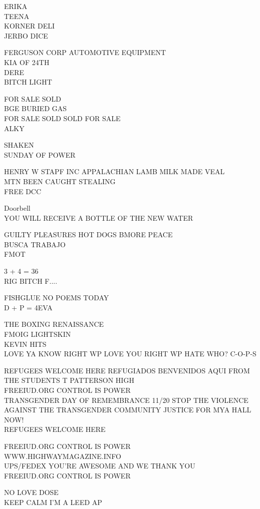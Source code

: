 \documentclass[10pt,letterpaper]{article}
\begin{document}
ERIKA\\
TEENA\\
KORNER DELI\\
JERBO DICE

FERGUSON CORP AUTOMOTIVE EQUIPMENT\\
KIA OF 24TH\\
DERE\\
BITCH LIGHT

FOR SALE SOLD\\
BGE BURIED GAS\\
FOR SALE SOLD SOLD FOR SALE\\
ALKY

SHAKEN\\
SUNDAY OF POWER

HENRY W STAPF INC APPALACHIAN LAMB MILK MADE VEAL\\
MTN BEEN CAUGHT STEALING\\
FREE DCC

Doorbell\\
YOU WILL RECEIVE A BOTTLE OF THE NEW WATER

GUILTY PLEASURES HOT DOGS BMORE PEACE\\
BUSCA TRABAJO\\
FMOT

3 + 4 = 36\\
RIG BITCH F....

FISHGLUE NO POEMS TODAY\\
D + P = 4EVA

THE BOXING RENAISSANCE\\
FMOIG LIGHTSKIN\\
KEVIN HITS\\
LOVE YA KNOW RIGHT WP LOVE YOU RIGHT WP HATE WHO? C{-}O{-}P{-}S

REFUGEES WELCOME HERE REFUGIADOS BENVENIDOS AQUI FROM THE STUDENTS T PATTERSON HIGH\\
FREEIUD.ORG CONTROL IS POWER\\
TRANSGENDER DAY OF REMEMBRANCE 11/20 STOP THE VIOLENCE AGAINST THE TRANSGENDER COMMUNITY JUSTICE FOR MYA HALL NOW!\\
REFUGEES WELCOME HERE

FREEIUD.ORG CONTROL IS POWER\\
WWW.HIGHWAYMAGAZINE.INFO\\
UPS/FEDEX YOU'RE AWESOME AND WE THANK YOU\\
FREEIUD.ORG CONTROL IS POWER

NO LOVE DOSE\\
KEEP CALM I'M A LEED AP
\end{document}
